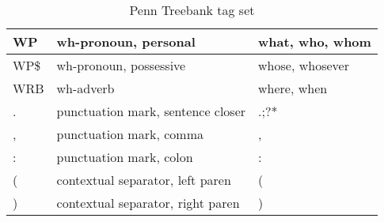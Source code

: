 \begin{table}[!ht]
{\begin{tabular}{|l|l|l|}
            WP           & wh-pronoun, personal                      & what, who, whom            \\ \hline
            WP\$         & wh-pronoun, possessive                    & whose, whosever            \\ \hline
            WRB          & wh-adverb                                 & where, when                \\ \hline
            .            & punctuation mark, sentence closer         & .;?*                       \\ \hline
            ,            & punctuation mark, comma                   & ,                          \\ \hline
            :            & punctuation mark, colon                   & :                          \\ \hline
            (            & contextual separator, left paren          & (                          \\ \hline
            )            & contextual separator, right paren         & )                          \\ \hline
        \end{tabular}%
    }
    \caption{Penn Treebank tag set}
    \label{tab:penntagset}
\end{table}